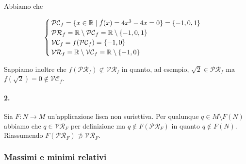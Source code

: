 Abbiamo che

\begin{equation}
	\begin{cases}
		\mathcal{PC}_{f} = \{ x \in \mathbb{R} \mid \dot{f}(x) = 4 x^{3} - 4 x = 0 \} = \{ -1, 0, 1 \}\\
		\mathcal{PR}_{f} = \mathbb{R} \setminus \mathcal{PC}_{f} = \mathbb{R} \setminus \{ -1, 0, 1 \}\\
		\mathcal{VC}_{f} = f(\mathcal{PC}_{f}) = \{ -1, 0 \}\\
		\mathcal{VR}_{f} = \mathbb{R} \setminus \mathcal{VC}_{f} = \mathbb{R} \setminus \{ -1, 0 \}
	\end{cases}
\end{equation}

Sappiamo inoltre che $ f(\mathcal{PR}_{f}) \not\subset \mathcal{VR}_{f} $ in quanto, ad esempio, $ \sqrt{2} \in \mathcal{PR}_{f} $ ma $ f(\sqrt{2}) = 0 \notin \mathcal{VC}_{f} $.

\paragraph{2.}

Sia $ F : N \to M $ un'applicazione lisca non suriettiva. Per qualunque $ q \in M \setminus F(N) $ abbiamo che $ q \in \mathcal{VR}_{F} $ per definizione ma $ q \notin F(\mathcal{PR}_{F}) $ in quanto $ q \notin F(N) $.\\
Riassumendo $ F(\mathcal{PR}_{F}) \not\supset \mathcal{VR}_{F} $.

\subsubsection{Massimi e minimi relativi}

